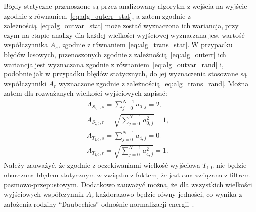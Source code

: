 Błędy statyczne przenoszone są przez analizowany algorytm z wejścia na wyjście zgodnie z równaniem~\eqref{eq:alg_outerr_stat}, a zatem zgodnie z zależnością~\eqref{eq:alg_outvar_stat} może zostać wyznaczona ich wariancja, przy czym na etapie analizy dla każdej wielkości wyjściowej wyznaczana jest wartość współczynnika $A_{s}$, zgodnie z równaniem~\eqref{eq:alg_trans_stat}. W przypadku błędów losowych, przenoszonych zgodnie z zależnością~\eqref{eq:alg_outerr} ich wariancja jest wyznaczana zgodnie z równaniem~\eqref{eq:alg_outvar_rand} i, podobnie jak w przypadku błędów statycznych, do jej wyznaczenia stosowane są współczynniki $A_{r}$ wyznaczone zgodnie z zależnością~\eqref{eq:alg_trans_rand}. Można zatem dla rozważanych wielkości wyjściowych zapisać:
\begin{gather}
A_{S_{2,0},s} = \sum _{j = 0} ^{N-1} a_{0, j} = 2 \label{eq:sym_partd_output_as_S_2_0}, \\
A_{S_{2,0},r} = \sqrt{\sum _{j = 0} ^{N-1} a_{0, j}^{2}} = 1 \label{eq:sym_partd_output_ar_S_2_0}, \\
A_{T_{1,0},s} = \sum _{j = 0} ^{N-1} a_{4, j} = 0 \label{eq:sym_partd_output_as_T_1_0}, \\
A_{T_{1,0},r} = \sqrt{\sum _{j = 0} ^{N-1} a_{4, j}^{2}} = 1 \label{eq:sym_partd_output_ar_T_1_0}.
\end{gather}
Należy zauważyć, że zgodnie z oczekiwaniami wielkość wyjściowa $T_{1,0}$ nie będzie obarczona błędem statycznym w związku z faktem, że jest ona związana z filtrem pasmowo-przepustowym. Dodatkowo zauważyć można, że dla wszystkich wielkości wyjściowych współczynnik $A_{r}$ każdorazowo będzie równy jedności, co wynika z założenia rodziny \enquote{Daubechies} odnośnie normalizacji energii~\cite{vonesch_dbbasics, wei_coiflet}.

